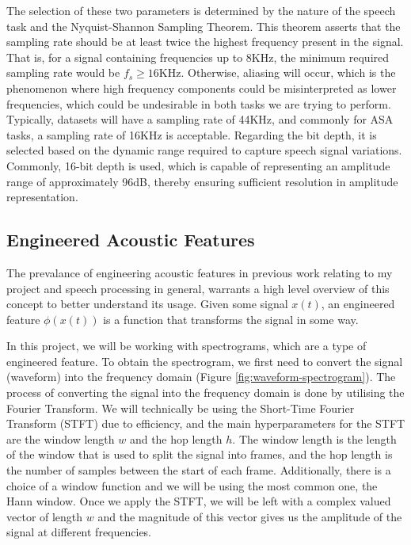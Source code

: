 \documentclass[logo,bsc,singlespacing,parskip,online]{infthesis}
\begin{document}
The selection of these two parameters is determined by the nature of the speech task and the Nyquist-Shannon Sampling Theorem.
This theorem asserts that the sampling rate should be at least twice the highest frequency present in the signal. 
That is, for a signal containing frequencies up to 8KHz, the minimum required sampling rate would be $f_s \ge 16$KHz.
Otherwise, aliasing will occur, which is the phenomenon where high frequency components could be misinterpreted as lower frequencies,
which could be undesirable in both tasks we are trying to perform. Typically, datasets will have a sampling rate 
of 44KHz, and commonly for ASA tasks, a sampling rate of 16KHz is acceptable. 
Regarding the bit depth, it is selected based on the dynamic range required to capture speech signal variations. 
Commonly, 16-bit depth is used, which is capable of representing an amplitude range of approximately 96dB, thereby ensuring sufficient resolution in amplitude representation.

\subsection{Engineered Acoustic Features}
The prevalance of engineering acoustic features in previous work relating to my project and speech processing in general,
warrants a high level overview of this concept to better understand its usage. 
Given some signal $x(t)$, an engineered feature $\phi(x(t))$ is a function that transforms the signal in some way.

In this project, we will be working with spectrograms, which are a type of engineered feature.
To obtain the spectrogram, we first need to convert the signal (waveform) into the frequency domain (Figure \ref{fig:waveform-spectrogram}).
The process of converting the signal into the frequency domain is done by utilising 
the Fourier Transform. We will technically be using the Short-Time Fourier Transform (STFT) 
due to efficiency, and the main hyperparameters for the STFT are the window length $w$ 
and the hop length $h$. The window length is the length of the window that is used to 
split the signal into frames, and the hop length is the number of samples between the 
start of each frame. Additionally, there is a choice of a window function and we will 
be using the most common one, the Hann window. Once we apply the STFT, we will be 
left with a complex valued vector of length $w$ and the magnitude of this vector 
gives us the amplitude of the signal at different frequencies. 
\end{document}
